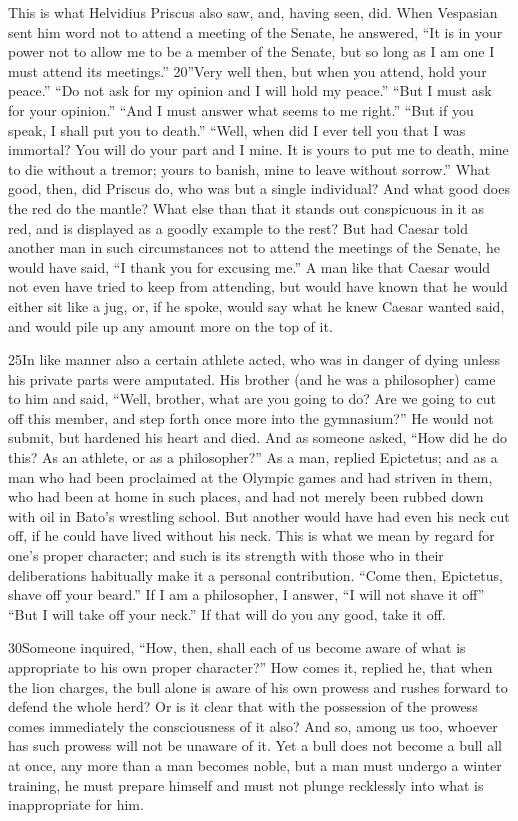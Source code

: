 This is what Helvidius Priscus also saw, and, having seen, did. When Vespasian sent him word not to attend a meeting of the Senate, he answered, ``It is in your power not to allow me to be a member of the Senate, but so long as I am one I must attend its meetings.'' 20''Very well then, but when you attend, hold your peace.'' ``Do not ask for my opinion and I will hold my peace.'' ``But I must ask for your opinion.'' ``And I must answer what seems to me right.'' ``But if you speak, I shall put you to death.'' ``Well, when did I ever tell you that I was immortal? You will do your part and I mine. It is yours to put me to death, mine to die without a tremor; yours to banish, mine to leave without sorrow.'' What good, then, did Priscus do, who was but a single individual? And what good does the red do the mantle? What else than that it stands out conspicuous in it as red, and is displayed as a goodly example to the rest? But had Caesar told another man in such circumstances not to attend the meetings of the Senate, he would have said, ``I thank you for excusing me.'' A man like that Caesar would not even have tried to keep from attending, but would have known that he would either sit like a jug, or, if he spoke, would say what he knew Caesar wanted said, and would pile up any amount more on the top of it.

25In like manner also a certain athlete acted, who was in danger of dying unless his private parts were amputated. His brother (and he was a philosopher) came to him and said, ``Well, brother, what are you going to do? Are we going to cut off this member, and step forth once more into the gymnasium?'' He would not submit, but hardened his heart and died. And as someone asked, ``How did he do this? As an athlete, or as a philosopher?'' As a man, replied Epictetus; and as a man who had been proclaimed at the Olympic games and had striven in them, who had been at home in such places, and had not merely been rubbed down with oil in Bato's wrestling school. But another would have had even his neck cut off, if he could have lived without his neck. This is what we mean by regard for one's proper character; and such is its strength with those who in their deliberations habitually make it a personal contribution. ``Come then, Epictetus, shave off your beard.'' If I am a philosopher, I answer, ``I will not shave it off'' ``But I will take off your neck.'' If that will do you any good, take it off.

30Someone inquired, ``How, then, shall each of us become aware of what is appropriate to his own proper character?'' How comes it, replied he, that when the lion charges, the bull alone is aware of his own prowess and rushes forward to defend the whole herd? Or is it clear that with the possession of the prowess comes immediately the consciousness of it also? And so, among us too, whoever has such prowess will not be unaware of it. Yet a bull does not become a bull all at once, any more than a man becomes noble, but a man must undergo a winter training, he must prepare himself and must not plunge recklessly into what is inappropriate for him.

